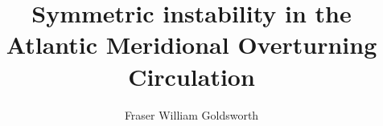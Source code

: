 \documentclass[12pt, rectanglelogo]{ociamthesis}
\title{Symmetric instability in the
        Atlantic Meridional Overturning Circulation}   %
\author{Fraser William Goldsworth}
\begin{document}

\maketitle

\begin{romanpages} 



\tableofcontents
\listoffigures
\end{romanpages}





%
%

\end{document}
